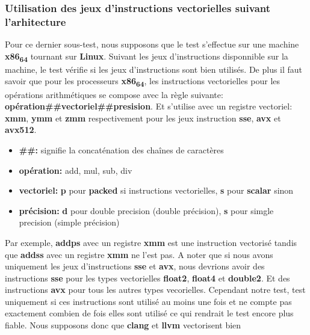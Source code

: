 \documentclass[11pt]{article}
\begin{document}
\subsubsection{Utilisation des jeux d'instructions vectorielles suivant l'arhitecture}
\label{sec:orgf847cb5}

Pour ce dernier sous-test, nous supposons que le test s'effectue
sur une machine \textbf{x86\textsubscript{64}} tournant sur \textbf{Linux}.
\vspace{5mm}
Suivant les jeux d'instructions disponnible sur la machine, le
test vérifie si les jeux d'instructions sont bien utilisés.
\vspace{5mm}
De plus il faut savoir que pour les processeurs \textbf{x86\textsubscript{64}}, les
instructions vectorielles pour les opérations arithmétiques 
se compose avec la règle suivante:
\textbf{opération\#\#vectoriel\#\#presision}.
Et s'utilise avec un registre vectoriel: \textbf{xmm}, \textbf{ymm} et \textbf{zmm}
respectivement pour les jeux instruction \textbf{sse}, \textbf{avx} et \textbf{avx512}.
\begin{itemize}
\item \textbf{\#\#:} signifie la concaténation des chaînes de caractères
\item \textbf{opération:} add, mul, sub, div
\item \textbf{vectoriel:} \textbf{p} pour \textbf{packed} si instructions vectorielles,
\textbf{s} pour \textbf{scalar} sinon
\item \textbf{précision:} \textbf{d} pour double precision (double précision), \textbf{s} pour simgle
precision (simple précision)
\end{itemize}
\vspace{5mm}
Par exemple, \textbf{addps} avec un registre \textbf{xmm} est une instruction
vectorisé tandis que \textbf{addss} avec un registre \textbf{xmm} ne l'est pas.
\vspace{5mm}
A noter que si nous avons uniquement les jeux d'instructions
\textbf{sse} et \textbf{avx}, nous devrions avoir des instructions \textbf{sse} pour
les types vectorielles \textbf{float2}, \textbf{float4} et \textbf{double2}. Et des
instructions \textbf{avx} pour tous les autres types vecorielles.
\vspace{5mm}
Cependant notre test, test uniquement si ces instructions sont
utilisé au moins une fois et ne compte pas exactement combien de
fois elles sont utilisé ce qui rendrait le test encore plus
fiable. Nous supposons donc que \textbf{clang} et \textbf{llvm} vectorisent bien
\end{document}

